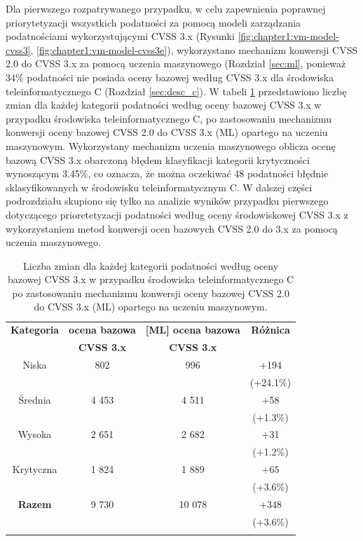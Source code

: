 \bigbreak
Dla pierwszego rozpatrywanego przypadku, w celu zapewnienia poprawnej priorytetyzacji wszystkich podatności za pomocą modeli zarządzania podatnościami wykorzystującymi CVSS 3.x (Rysunki \ref{fig:chapter1:vm-model-cvss3}, \ref{fig:chapter1:vm-model-cvss3e}), wykorzystano mechanizm konwersji CVSS 2.0 do CVSS 3.x za pomocą uczenia maszynowego (Rozdział \ref{sec:ml}, ponieważ 34\% podatności nie posiada oceny bazowej według CVSS 3.x dla środowiska teleinformatycznego C (Rozdział \ref{sec:desc_c}). W tabeli \ref{tab:chapter6:env_c:ml_classification} przedstawiono liczbę zmian dla każdej kategorii podatności według oceny bazowej CVSS 3.x w przypadku środowiska teleinformatycznego C, po zastosowaniu mechanizmu konwersji oceny bazowej CVSS 2.0 do CVSS 3.x (ML) opartego na uczeniu maszynowym. Wykorzystany mechanizm uczenia maszynowego oblicza ocenę bazową CVSS 3.x obarczoną błędem klasyfikacji kategorii krytyczności wynoszącym 3.45\%, co oznacza, że można oczekiwać 48 podatności błędnie sklasyfikowanych w środowisku teleinformatycznym C. W dalszej części podrozdziału skupiono się tylko na analizie wyników przypadku pierwszego dotyczącego prioretetyzacji podatności według oceny środowiskowej CVSS 3.x z wykorzystaniem metod konwersji ocen bazowych CVSS 2.0 do 3.x za pomocą uczenia maszynowego.


\begin{table}[tbh]
\caption{Liczba zmian dla każdej kategorii podatności według oceny bazowej CVSS 3.x w przypadku środowiska teleinformatycznego C po zastosowaniu mechanizmu konwersji oceny bazowej CVSS 2.0 do CVSS 3.x (ML) opartego na uczeniu maszynowym.}
\begin{center}
\label{tab:chapter6:env_c:ml_classification}
\begin{tabular}{cccc}
\hline \noalign {\smallskip}
\textbf{Kategoria} & \textbf{ocena bazowa} & \textbf{[ML] ocena bazowa} & \textbf{Różnica} \\
                      & \textbf{CVSS 3.x} & \textbf{CVSS 3.x} & \\
  \hline
  Niska         &    802 &  996    &  +194          \\
                &        &         &  (+24.1\%)     \\
  Średnia       &  4 453 &   4 511 &  +58           \\
                &        &         &  (+1.3\%)       \\
  Wysoka        &  2 651 &   2 682 &  +31           \\
                &        &         &  (+1.2\%)   \\
  Krytyczna     &  1 824 &  1 889  &  +65          \\
                &        &         &  (+3.6\%)   \\
\hline \noalign {\smallskip}
\textbf{Razem}  &   9 730 &   10 078& +348 \\
                &        &         & (+3.6\%) \\
\hline \noalign {\smallskip}
\end{tabular}
\end{center}
\end{table}

